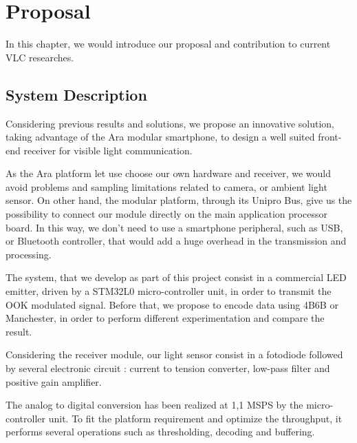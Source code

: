 
\chapter{Proposal} %

\label{Proposal} %


In this chapter, we would introduce our proposal and contribution to current VLC researches. 


\section{System Description}


Considering previous results and solutions, we propose an innovative solution, taking advantage of the Ara modular smartphone,
to design a well suited front-end receiver for visible light communication.

As the Ara platform let use choose our own hardware and receiver, we would avoid problems and sampling limitations related to camera, or ambient light sensor.
On other hand, the modular platform, through its Unipro Bus, give us the possibility to connect our module directly on the  main application processor board.
In this way, we don't need to use a smartphone peripheral, such as USB, or Bluetooth controller, that would add a huge overhead in the transmission and processing.

The system, that we develop as part of this project consist in a commercial LED emitter, driven by a STM32L0 micro-controller unit, in order to transmit the OOK modulated signal. Before that, we propose to encode data using 4B6B or Manchester, in order to perform different experimentation and compare the result.

Considering the receiver module, our light sensor consist in a fotodiode followed by several electronic circuit : current to tension converter, low-pass filter and positive gain amplifier.

The analog to digital conversion has been realized at 1,1 MSPS by the micro-controller unit. To fit the platform requirement and optimize the throughput, it performs several operations such as thresholding, decoding and buffering.

